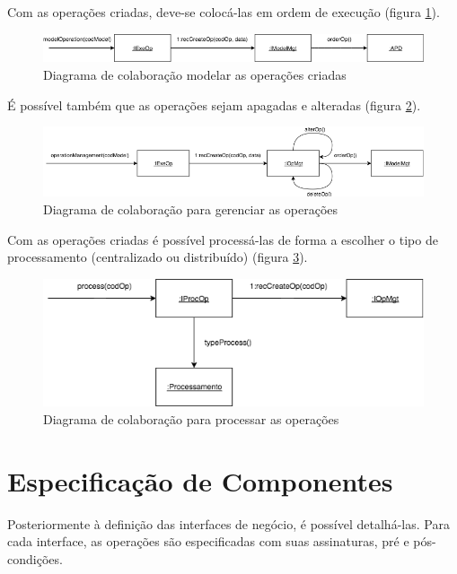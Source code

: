 Com as operações criadas, deve-se colocá-las em ordem de execução (figura \ref{modelOperation}).

\begin{figure}[h!]
	\centering
	\includegraphics[scale=0.5]{fig/modelOperation.png}
	\caption{Diagrama de colaboração modelar as operações criadas}
	\label{modelOperation}
\end{figure}

É possível também que as operações sejam apagadas e alteradas (figura \ref{operationManagement}).

\begin{figure}[h!]
	\centering
	\includegraphics[scale=0.5]{fig/operationManagement.png}
	\caption{Diagrama de colaboração para gerenciar as operações}
	\label{operationManagement}
\end{figure}

Com as operações criadas é possível processá-las de forma a escolher o tipo de processamento (centralizado ou distribuído) (figura \ref{process}).

\begin{figure}[h!]
	\centering
	\includegraphics[scale=0.5]{fig/process.png}
	\caption{Diagrama de colaboração para processar as operações}
	\label{process}
\end{figure}

\section{Especificação de Componentes}

Posteriormente à definição das interfaces de negócio, é possível detalhá-las. Para cada interface, as operações são especificadas com suas assinaturas, pré e pós-condições.

